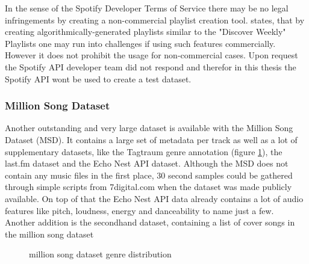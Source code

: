 In the sense of the Spotify Developer Terms of Service \cite{spottac2} there may be no legal infringements by creating a non-commercial playlist creation tool. \cite{spottac3} states, that by creating algorithmically-generated playlists similar to the "Discover Weekly" Playlists one may run into challenges if using such features commercially. 
However it does not prohibit the usage for non-commercial cases.  
Upon request the Spotify API developer team did not respond and therefor in this thesis the Spotify API wont be used to create a test dataset.

\subsubsection{Million Song Dataset}

Another outstanding and very large dataset is available with the Million Song Dataset (MSD)\cite{msd1}. 
It contains a large set of metadata per track as well as a lot of supplementary datasets, like the Tagtraum genre annotation (figure \ref{msddist})\cite{msd5}, the last.fm dataset\cite{msd2} and the Echo Nest API dataset\cite{msd3}. Although the MSD does not contain any music files in the first place, 30 second samples could be gathered through simple scripts from 7digital.com when the dataset was made publicly available. On top of that the Echo Nest API data already contains a lot of audio features like pitch, loudness, energy and danceability to name just a few.\\
Another addition is the secondhand dataset, containing a list of cover songs in the million song dataset\cite{msd6}
\begin{figure}[thpb]
	\centering
	\caption{million song dataset genre distribution}
	\label{msddist}
\end{figure}
